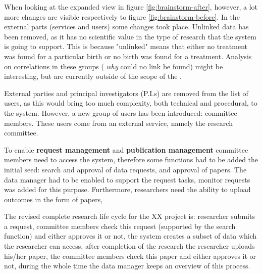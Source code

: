 When looking at the expanded view in figure \ref{fig:brainstorm-after}, however, a lot more changes are visible respectively to figure \ref{fig:brainstorm-before}.
In the external parts (services and users) some changes took place.
Unlinked data has been removed, as it has no scientific value in the type of research that the system is going to support.
This is because "unlinked" means that either no treatment was found for a particular birth or no birth was found for a treatment.
Analysis on correlations in these groups (\ie{} \emph{why} could no link be found) might be interesting, but are currently outside of the scope of the \project{}.

External parties and principal investigators (P.I.s) are removed from the list of users, as this would bring too much complexity, both technical and procedural, to the system.
However, a new group of users has been introduced: committee members.
These users come from an external service, namely the research committee. 

To enable \textbf{request management} and \textbf{publication management} committee members need to access the system, therefore some functions had to be added the initial seed: search and approval of data requests, and approval of papers.
The data manager had to be enabled to support the request tasks, monitor requests was added for this purpose.
Furthermore, researchers need the ability to upload outcomes in the form of papers, 

 The revised complete research life cycle for the XX project is:
researcher submits a request, 
committee members check this request (supported by the search function) and either approves it or not, 
the system creates a subset of data which the researcher can access, 
after completion of the research the researcher uploads his/her paper, 
the committee members check this paper and either approves it or not, 
during the whole time the data manager keeps an overview of this process.

